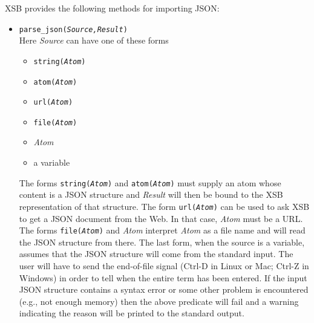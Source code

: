 XSB provides the following methods for importing JSON:
\begin{itemize}
\item
  \texttt{parse\_json(\emph{Source,Result})}\\
  Here \emph{Source} can have one of these forms
  \begin{itemize}
  \item   \texttt{string(\emph{Atom})}  
  \item   \texttt{atom(\emph{Atom})}
  \item   \texttt{url(\emph{Atom})}
  \item   \texttt{file(\emph{Atom})}
  \item   \emph{Atom}
  \item   a variable
  \end{itemize}
  The forms \texttt{string(\emph{Atom})} and \texttt{atom(\emph{Atom})}
  must supply an atom whose content is a JSON structure and
  \emph{Result} will then be bound to the XSB representation of that
  structure.
  The form \texttt{url(\emph{Atom})} can be used to ask XSB to get a JSON
  document from the Web. In that case, \emph{Atom} must be a URL. 
  The forms \texttt{file(\emph{Atom})} and \emph{Atom}
  interpret \emph{Atom} as a file name and will read the JSON structure
  from there. The last form, when the source is a variable, assumes
  that the JSON structure will come from the standard input. The user will
  have to send the end-of-file signal (Ctrl-D in Linux or Mac; Ctrl-Z in
  Windows) in order to tell when the entire term has been entered.
  If the input JSON structure contains a syntax error or some other problem
  is encountered (e.g., not enough memory) then the above predicate will
  fail and a warning indicating the reason will be printed to the standard
  output.


\end{itemize}
